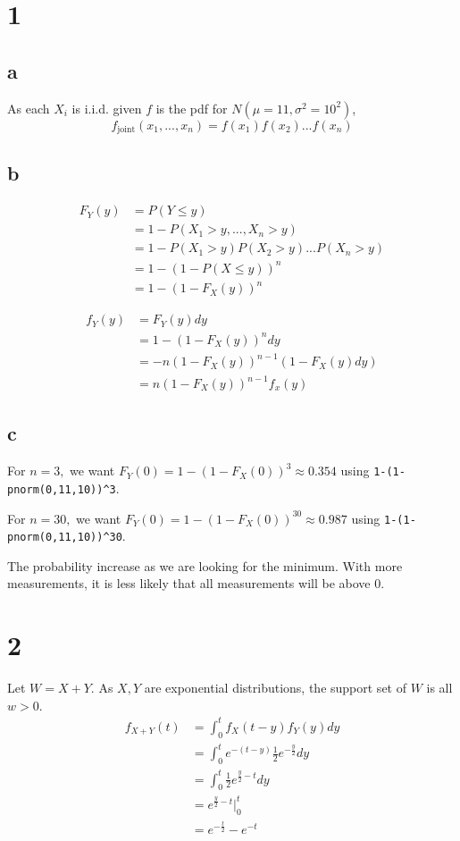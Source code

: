 \documentclass[10pt]{article}
\begin{document}
\section*{1}
\subsection*{a}
As each $X_i$ is i.i.d. given $f$ is the pdf for $N(\mu=11,\sigma^2=10^2)$,
\[f_\text{joint}(x_1,...,x_n)=f(x_1)f(x_2)...f(x_n)\]

\subsection*{b}

\begin{align*}
    F_Y(y) &= P(Y\le y)\\
    &= 1 - P(X_1 > y,...,X_n > y)\\
    &= 1 - P(X_1>y)P(X_2>y)...P(X_n>y)\\
    &= 1 - (1-P(X\le y))^n\\
    &= 1 - (1-F_X(y))^n
\end{align*}

\begin{align*}
    f_Y(y) &= F_Y(y)dy\\
    &= 1 - (1-F_X(y))^ndy\\
    &= -n(1-F_X(y))^{n-1}(1-F_X(y)dy)\\
    &= n(1-F_X(y))^{n-1}f_x(y)
\end{align*}

\subsection*{c}
For $n=3,$ we want $F_Y(0)=1-(1-F_X(0))^3\approx 0.354$ using \texttt{1-(1-pnorm(0,11,10))\textasciicircum3}.

\noindent
For $n=30,$ we want $F_Y(0)=1-(1-F_X(0))^{30}\approx 0.987$ using \texttt{1-(1-pnorm(0,11,10))\textasciicircum30}.

The probability increase as we are looking for the minimum. With more measurements, it is less likely that all measurements will be above $0$.

\section*{2}
Let $W = X+Y.$ As $X,Y$ are exponential distributions, the support set of $W$ is all $w>0$.
\begin{align*}
    f_{X+Y}(t)&=\int_0^t f_X(t-y)f_Y(y)dy\\
    &=\int_0^t e^{-(t-y)}\frac{1}{2}e^{-\frac{y}{2}}dy\\
    &= \int_0^t\frac{1}{2}e^{\frac{y}{2}-t}dy\\
    &= e^{\frac{y}{2}-t} \Bigr |_0^t\\
    &= e^{-\frac{t}{2}}-e^{-t}
\end{align*}
\end{document}
